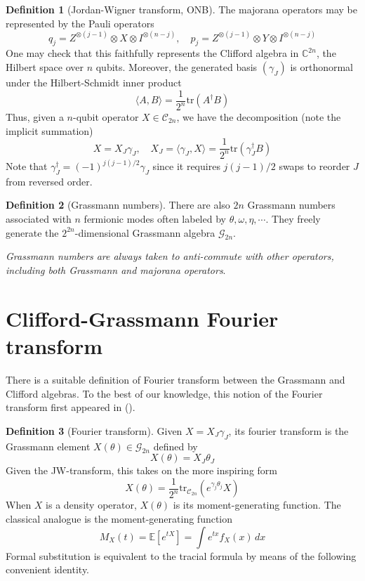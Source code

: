 \documentclass[
]{book}
\theoremstyle{definition}
\newtheorem{definition}{Definition}[chapter]
\theoremstyle{definition}
\theoremstyle{definition}
\theoremstyle{definition}
\theoremstyle{remark}
\begin{document}
\begin{definition}[Jordan-Wigner transform, ONB]
\protect\hypertarget{def:jw}{}\label{def:jw}The majorana operators may be represented by the Pauli operators
\[
    q_j = Z^{\otimes (j-1)}\otimes X \otimes I^{\otimes (n-j)}, 
    \quad p_j = Z^{\otimes (j-1)}\otimes Y \otimes I^{\otimes (n-j)}
\]
One may check that this faithfully represents the Clifford algebra in
\(\mathbb C^{2n}\), the Hilbert space over \(n\) qubits. Moreover, the generated
basis \((\gamma_J)\) is orthonormal under the Hilbert-Schmidt inner product
\[ 
    \langle A, B\rangle= \dfrac 1 {2^n} \mathrm{tr}(A^\dagger B)
\]
Thus, given a \(n\)-qubit operator \(X\in \mathcal C_{2n}\), we have the decomposition
(note the implicit summation)
\[ 
    X = X_J \gamma_J, \quad 
    X_J = \langle\gamma_J, X\rangle= \dfrac 1 {2^n} \mathrm{tr}(\gamma_J^\dagger B)
\]
Note that \(\gamma_J^\dagger= (-1)^{j(j-1)/2}\gamma_J\) since it requires
\(j(j-1)/2\) swaps to reorder \(J\) from reversed order.
\end{definition}

\begin{definition}[Grassmann numbers]
\protect\hypertarget{def:gra}{}\label{def:gra}There are also \(2n\) Grassmann numbers associated with \(n\) fermionic modes
often labeled by \(\theta, \omega, \eta, \cdots\).
They freely generate the \(2^{2n}\)-dimensional Grassmann algebra \(\mathcal G_{2n}\).

\emph{Grassmann numbers are always taken to anti-commute with other operators,
including both Grassmann and majorana operators}.
\end{definition}

\section{Clifford-Grassmann Fourier transform}\label{clifford-grassmann-fourier-transform}

There is a suitable definition of Fourier transform between the
Grassmann and Clifford algebras. To the best of our knowledge,
this notion of the Fourier transform first appeared in ().

\begin{definition}[Fourier transform]
\protect\hypertarget{def:clgrabij}{}\label{def:clgrabij}Given \(X=X_J\gamma_J\), its fourier transform is the Grassmann element
\(X(\theta)\in \mathcal G_{2n}\) defined by
\[ 
    X(\theta) = X_J \theta_J 
\]
Given the JW-transform, this takes on the more inspiring form
\[ 
    X(\theta) = \dfrac 1 {2^n} \mathrm{tr}_{\mathcal C_{2n}}(e^{\gamma_j\theta_j} X)
\]
When \(X\) is a density operator, \(X(\theta)\) is its moment-generating
function. The classical analogue is the moment-generating function
\[ 
    M_X(t) = \mathbb E[e^{tX}] = \int e^{tx} f_X(x)\, dx 
\]
Formal substitution is equivalent to the tracial formula
by means of the following convenient identity.
\end{definition}
\end{document}
